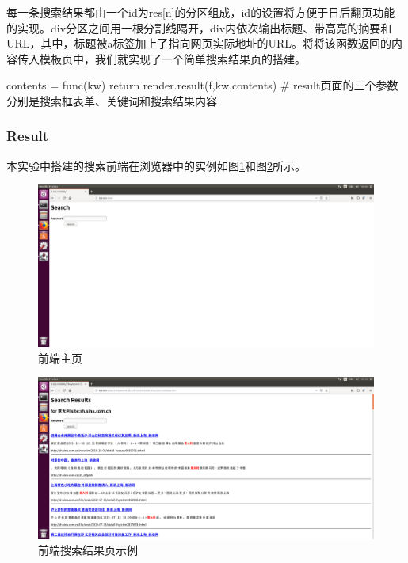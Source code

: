 \documentclass{article}
\begin{document}
每一条搜索结果都由一个id为res[n]的分区组成，id的设置将方便于日后翻页功能的实现。div分区之间用一根分割线隔开，div内依次输出标题、带高亮的摘要和URL，其中，标题被a标签加上了指向网页实际地址的URL。将将该函数返回的内容传入模板页中，我们就实现了一个简单搜索结果页的搭建。

\begin{python}
contents = func(kw)
return render.result(f,kw,contents)
# result页面的三个参数分别是搜索框表单、关键词和搜索结果内容
\end{python}

\subsubsection{Result}

本实验中搭建的搜索前端在浏览器中的实例如图\ref{fig:exp1}和图\ref{fig:exp2}所示。

\begin{figure}[htbp]
\centering
\includegraphics[width=14.5cm]{img/home.png}
\caption{前端主页}
\label{fig:exp1}
\end{figure}

\begin{figure}[htbp]
\centering
\includegraphics[width=14.5cm]{img/searchpage.png}
\caption{前端搜索结果页示例}
\label{fig:exp2}
\end{figure}
\end{document}
